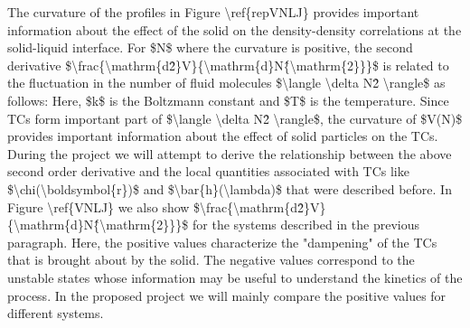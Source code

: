 \par The curvature of the profiles in Figure \textbackslash ref\{repVNLJ\} provides important information about the effect of the solid on the density-density correlations at the solid-liquid interface. For \$N\$ where the curvature is positive, the second derivative \$\textbackslash frac\{\textbackslash mathrm\{d\^2\}V\}\{\textbackslash mathrm\{d\}N\^\{\textbackslash mathrm\{2\}\}\}\$ is related to the fluctuation in the number of fluid molecules \$\textbackslash langle \textbackslash delta N\^2 \textbackslash rangle\$ as follows: Here, \$k\$ is the Boltzmann constant and \$T\$ is the temperature. Since TCs form important part of \$\textbackslash langle \textbackslash delta N\^2 \textbackslash rangle\$, the curvature of \$V(N)\$ provides important information about the effect of solid particles on the TCs. During the project we will attempt to derive the relationship between the above second order derivative and the local quantities associated with TCs like \$\textbackslash chi(\textbackslash boldsymbol\{r\})\$ and \$\textbackslash bar\{h\}(\textbackslash lambda)\$ that were described before. In Figure \textbackslash ref\{VNLJ\} we also show \$\textbackslash frac\{\textbackslash mathrm\{d\^2\}V\}\{\textbackslash mathrm\{d\}N\^\{\textbackslash mathrm\{2\}\}\}\$ for the systems described in the previous paragraph. Here, the positive values  characterize the "dampening" of the TCs that is brought about by the solid. The negative values correspond to the unstable states whose information may be useful to understand the kinetics of the process. In the proposed project we will mainly compare the positive values for different systems.
